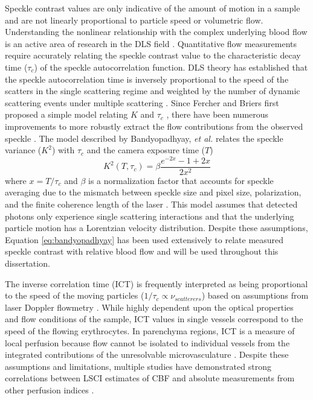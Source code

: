 Speckle contrast values are only indicative of the amount of motion in a sample and are not linearly proportional to particle speed or volumetric flow. Understanding the nonlinear relationship with the complex underlying blood flow is an active area of research in the DLS field \cite{Duncan:2008fd, Briers:2013es}. Quantitative flow measurements require accurately relating the speckle contrast value to the characteristic decay time ($\tau_c$) of the speckle autocorrelation function. DLS theory has established that the speckle autocorrelation time is inversely proportional to the speed of the scatters in the single scattering regime \cite{Bonner:1981hga} and weighted by the number of dynamic scattering events under multiple scattering \cite{Boas:1997kf, Kazmi:2015du, Davis:2016ik}. Since Fercher and Briers first proposed a simple model relating $K$ and $\tau_c$ \cite{Fercher:1981jh}, there have been numerous improvements to more robustly extract the flow contributions from the observed speckle \cite{Bandyopadhyay:2005bg, Parthasarathy:2008el}. The model described by Bandyopadhyay, \textit{et al.} \cite{Bandyopadhyay:2005bg} relates the speckle variance ($K^2$) with $\tau_c$ and the camera exposure time ($T$)
%
\begin{equation}
    \label{eq:bandyopadhyay}
    K^2(T,\tau_c) = \beta \frac{e^{-2x} - 1 + 2x}{2x^{2}}
\end{equation}
%
where $x = T/\tau_c$ and $\beta$ is a normalization factor that accounts for speckle averaging due to the mismatch between speckle size and pixel size, polarization, and the finite coherence length of the laser \cite{Lemieux:1999ko}. This model assumes that detected photons only experience single scattering interactions and that the underlying particle motion has a Lorentzian velocity distribution. Despite these assumptions, Equation \ref{eq:bandyopadhyay} has been used extensively to relate measured speckle contrast with relative blood flow \cite{Dunn:2011gi,Boas:2010vr} and will be used throughout this dissertation.

The inverse correlation time (ICT) is frequently interpreted as being proportional to the speed of the moving particles ($1/\tau_c \propto \nu_{scatterers}$) based on assumptions from laser Doppler flowmetry \cite{Bonner:1981hga}. While highly dependent upon the optical properties and flow conditions of the sample, ICT values in single vessels correspond to the speed of the flowing erythrocytes. In parenchyma regions, ICT is a measure of local perfusion because flow cannot be isolated to individual vessels from the integrated contributions of the unresolvable microvasculature \cite{Durduran:2016el, Dunn:2011gi}. Despite these assumptions and limitations, multiple studies have demonstrated strong correlations between LSCI estimates of CBF and absolute measurements from other perfusion indices \cite{Ayata:2004ba, Strong:2005kj, Kazmi:2015du}.




